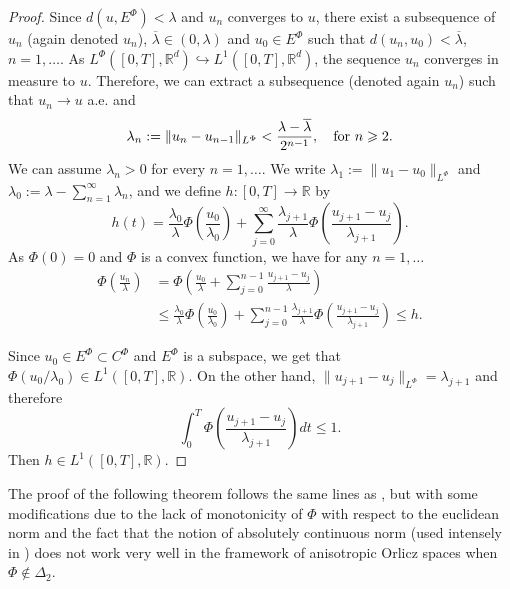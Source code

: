 \documentclass[twoside]{article}
\theoremstyle{remark}
\newcommand{\orlnor}{\|_{L^{\Phi}}}
\newcommand{\lphi}{L^{\Phi}}
\newcommand{\ephi}{E^{\Phi}}
\newcommand{\claseor}{C^{\Phi}}
\newcommand{\rr}{\mathbb{R}}
\renewcommand{\leq}{\leqslant}
\renewcommand{\geq}{\geqslant}
\begin{document}
\begin{proof}
  Since $d({u},\ephi)<\lambda$ and ${u}_n$ converges to ${u}$, there exist   a subsequence of $u_n$ (again denoted $u_n$), $\overline{\lambda}\in (0,\lambda)$ and $u_0\in\ephi$ such that $d(u_n,u_0)<\overline{\lambda}$, $n=1,\ldots$. As $\lphi\left([0,T],\rr^d\right)\hookrightarrow L^1\left([0,T],\rr^d\right)$, the sequence $u_n$ converges in measure to $u$. Therefore, we can extract a subsequence (denoted again $u_n$) such that $u_n\to u$ a.e. and
  \[\lambda_{n}:=\|{u}_{n}-{u}_{n-1}\orlnor<\frac{\lambda-\overline{\lambda}}{2^{n-1}},\quad\hbox{for } n\geq 2.\]
 We can assume $\lambda_n>0$ for every $n=1,\ldots$. We write $\lambda_1:=\|u_1-u_0\orlnor$ and  $\lambda_0:=\lambda-\sum_{n=1}^{\infty}\lambda_n$, and  we define $h:[0,T]\rightarrow\mathbb{R}$  by
 \begin{equation}\label{eq:serie} h(t)=  \frac{\lambda_0}{\lambda}\Phi\left(\frac{u_0}{\lambda_0}\right)+\sum_{j=0}^{\infty}\frac{\lambda_{j+1}}{\lambda}\Phi\left(\frac{u_{j+1}-u_j}{\lambda_{j+1}}\right).
\end{equation}
 As $\Phi(0)=0$ and  $\Phi$ is a convex function, we have for any $n=1,\ldots$
\[
 \begin{split}
   \Phi\left(\frac{u_n}{\lambda}\right) &=\Phi\left(  \frac{u_0}{\lambda}+   \sum_{j=0}^{n-1}\frac{u_{j+1}-u_j}{\lambda} \right)\\
   &\leq
   \frac{\lambda_0}{\lambda}\Phi\left(\frac{u_0}{\lambda_0}\right)+\sum_{j=0}^{n-1}\frac{\lambda_{j+1}}{\lambda}\Phi\left(\frac{u_{j+1}-u_j}{\lambda_{j+1}}\right) \leq h.
 \end{split}
\]

Since $u_0\in\ephi\subset \claseor$ and $\ephi$ is a subspace, we get that $\Phi(u_0/\lambda_0)\in L^1([0,T],\rr)$.
On the other hand, $\|u_{j+1}-u_j\orlnor = \lambda_{j+1}$ and therefore
\[
\int_0^T\Phi\left(\frac{u_{j+1}-u_j}{\lambda_{j+1}}\right)dt\leq 1.
\]
Then $h\in L^1([0,T],\rr)$. \end{proof}





The  proof of the following theorem follows the same lines as \cite[Thm. 3.2]{ABGMS2015}, but with some modifications due to the lack of monotonicity of $\Phi$ with  respect to the euclidean norm and the fact that  the notion of absolutely continuous norm (used intensely in \cite[Thm. 3.2]{ABGMS2015}) does not work very well in the framework of anisotropic Orlicz spaces when $\Phi \notin \Delta_2$.
\end{document}
